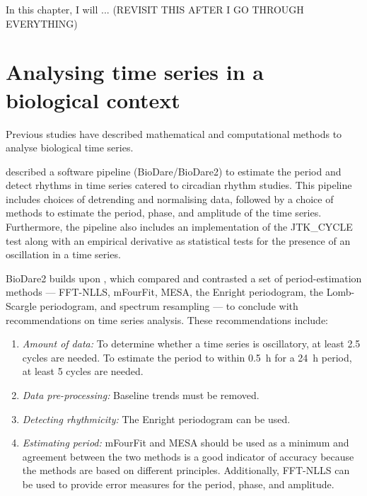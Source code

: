 In this chapter, I will ... (REVISIT THIS AFTER I GO THROUGH EVERYTHING)


\section{Analysing time series in a biological context}
\label{sec:analysis-literature}

Previous studies have described mathematical and computational methods to analyse biological time series.

\textcite{zielinskiPeriodEstimationRhythm2022} described a software pipeline (BioDare/BioDare2) to estimate the period and detect rhythms in time series catered to circadian rhythm studies.
This pipeline includes choices of detrending and normalising data, followed by a choice of methods to estimate the period, phase, and amplitude of the time series.
Furthermore, the pipeline also includes an implementation of the JTK\_CYCLE test \parencite{hughesJTK_CYCLEEfficientNonparametric2010} along with an empirical derivative \parencite{hutchisonImprovedStatisticalMethods2015a} as statistical tests for the presence of an oscillation in a time series.

BioDare2 builds upon \textcite{zielinskiStrengthsLimitationsPeriod2014}, which compared and contrasted a set of period-estimation methods ---
FFT-NLLS, mFourFit, MESA, the Enright periodogram, the Lomb-Scargle periodogram, and spectrum resampling --- to conclude with recommendations on time series analysis.
These recommendations include:
\begin{enumerate}
  \item \emph{Amount of data:} To determine whether a time series is oscillatory, at least 2.5 cycles are needed.
        To estimate the period to within \SI{0.5}{\hour} for a \SI{24}{\hour} period, at least 5 cycles are needed.
  \item \emph{Data pre-processing:} Baseline trends must be removed.
  \item \emph{Detecting rhythmicity:} The Enright periodogram can be used.
  \item \emph{Estimating period:} mFourFit and MESA should be used as a minimum and agreement between the two methods is a good indicator of accuracy because the methods are based on different principles.
        Additionally, FFT-NLLS can be used to provide error measures for the period, phase, and amplitude.
\end{enumerate}

